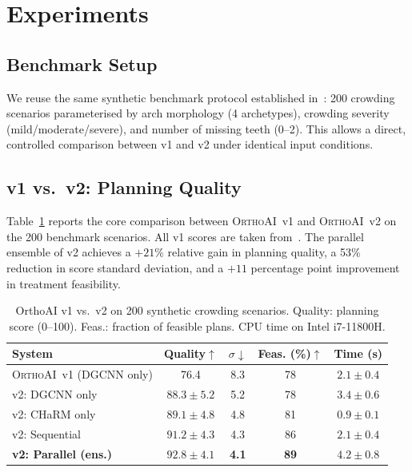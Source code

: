 \documentclass[10pt,twocolumn]{article}
\newcommand{\orthoai}{\textsc{OrthoAI}}
\newcommand{\vone}{\orthoai{}~v1}
\newcommand{\vtwo}{\orthoai{}~v2}
\begin{document}
\section{Experiments}
\label{sec:exp}

\subsection{Benchmark Setup}

We reuse the same synthetic benchmark protocol established in~\cite{lansiaux2026orthoaiv1}:
200 crowding scenarios parameterised by arch morphology (4 archetypes),
crowding severity (mild/moderate/severe), and number of missing teeth (0--2).
This allows a direct, controlled comparison between v1 and v2 under
identical input conditions.

\subsection{v1 vs.\ v2: Planning Quality}

Table~\ref{tab:v1v2} reports the core comparison between \vone{} and \vtwo{}
on the 200 benchmark scenarios.
All v1 scores are taken from~\cite{lansiaux2026orthoaiv1}.
The parallel ensemble of v2 achieves a $+21\%$ relative gain in planning
quality, a 53\% reduction in score standard deviation, and a $+11$ percentage
point improvement in treatment feasibility.

\begin{table}[H]
\centering
\caption{OrthoAI v1 vs.\ v2 on 200 synthetic crowding scenarios.
Quality: planning score (0--100). Feas.: fraction of feasible plans.
CPU time on Intel i7-11800H.}
\label{tab:v1v2}
\small
\begin{tabular}{lcccc}
\toprule
System & Quality$\uparrow$ & $\sigma\downarrow$ & Feas. (\%)$\uparrow$ & Time (s) \\
\midrule
\vone{} (DGCNN only) & 76.4 & 8.3 & 78 & $2.1 \pm 0.4$ \\
\hline
v2: DGCNN only       & $88.3 \pm 5.2$ & 5.2 & 78 & $3.4 \pm 0.6$ \\
v2: CHaRM only       & $89.1 \pm 4.8$ & 4.8 & 81 & $0.9 \pm 0.1$ \\
v2: Sequential       & $91.2 \pm 4.3$ & 4.3 & 86 & $2.1 \pm 0.4$ \\
\textbf{v2: Parallel (ens.)} & $\mathbf{92.8 \pm 4.1}$ & \textbf{4.1} & \textbf{89} & $4.2 \pm 0.8$ \\
\bottomrule
\end{tabular}
\end{table}
\end{document}
